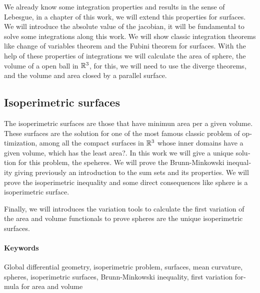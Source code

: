 \begin{otherlanguage}{american}
We already know some integration properties and results in the sense of Lebesgue, in a chapter of this work, we will extend this properties for surfaces. We will introduce the absolute value of the jacobian, it will be fundamental to solve some integrations along this work. We will show classic integration theorems like change of variables theorem and the Fubini theorem for surfaces. With the help of these properties of integrations we will calculate the area of sphere, the volume of a open ball in $\mathbb{R}^3$, for this, we will need to use the diverge theorems, and the volume and area closed by a parallel surface.

\subsection{Isoperimetric surfaces}

The isoperimetric surfaces are those that have minimun area per a given volume. These surfaces are the solution for one of the most famous classic problem of optimization, among all the compact surfaces in $\mathbb{R}^3$ whose inner domains have a given volume, which has the least area?. In this work we will give a unique solution for this problem, the speheres. We will prove the Brunn-Minkowski inequality giving previously an introduction to the sum sets and its properties. We will prove the isoperimetric inequality and some direct consequences like sphere is a isoperimetric surface.

Finally, we will introduces the variation tools to calculate the first variation of the area and volume functionals to prove spheres are the unique isoperimetric surfaces.

\paragraph{Keywords} Global differential geometry, isoperimetric problem, surfaces, mean curvature, spheres, isoperimetric surfaces, Brunn-Minkowski inequality, first variation formula for area and volume

\end{otherlanguage}

\newpage

